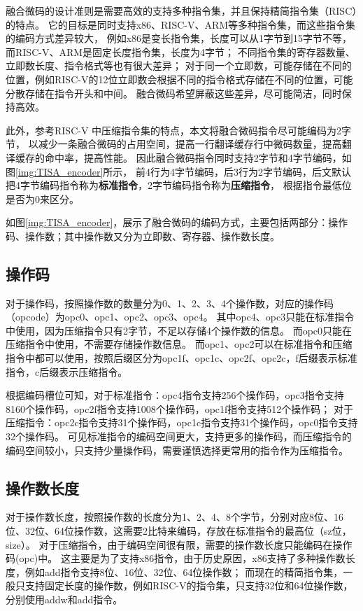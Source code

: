 融合微码的设计准则是需要高效的支持多种指令集，并且保持精简指令集（RISC）的特点。
它的目标是同时支持x86、RISC-V、ARM等多种指令集，而这些指令集的编码方式差异较大，
例如x86是变长指令集，长度可以从1字节到15字节不等，而RISC-V、ARM是固定长度指令集，长度为4字节；
不同指令集的寄存器数量、立即数长度、指令格式等也有很大差异；
对于同一个立即数，可能存储在不同的位置，例如RISC-V的12位立即数会根据不同的指令格式存储在不同的位置，可能分散存储在指令开头和中间。
融合微码希望屏蔽这些差异，尽可能简洁，同时保持高效。

此外，参考RISC-V 中压缩指令集的特点，本文将融合微码指令尽可能编码为2字节，
以减少一条融合微码的占用空间，提高一行翻译缓存行中微码数量，提高翻译缓存的命中率，提高性能。
因此融合微码指令同时支持2字节和4字节编码，如图\ref{img:TISA_encoder}所示，
前4行为4字节编码，后3行为2字节编码，后文默认把4字节编码指令称为\textbf{标准指令}，2字节编码指令称为\textbf{压缩指令}，
根据指令最低位是否为0来区分。

如图\ref{img:TISA_encoder}，展示了融合微码的编码方式，主要包括两部分：操作码、操作数；其中操作数又分为立即数、寄存器、操作数长度。



\subsection{操作码}
对于操作码，按照操作数的数量分为0、1、2、3、4个操作数，对应的操作码（opcode）为opc0、opc1、opc2、opc3、opc4。
其中opc4、opc3只能在标准指令中使用，因为压缩指令只有2字节，不足以存储4个操作数的信息。
而opc0只能在压缩指令中使用，不需要存储操作数信息。
而opc1、opc2可以在标准指令和压缩指令中都可以使用，按照后缀区分为opc1f、opc1c、opc2f、opc2c，f后缀表示标准指令，c后缀表示压缩指令。

根据编码槽位可知，对于标准指令：opc4指令支持256个操作码，opc3指令支持8160个操作码，opc2f指令支持1008个操作码，opc1f指令支持512个操作码；
对于压缩指令：opc2c指令支持31个操作码，opc1c指令支持31个操作码，opc0指令支持32个操作码。
可见标准指令的编码空间更大，支持更多的操作码，而压缩指令的编码空间较小，只支持少量操作码，需要谨慎选择更常用的指令作为压缩指令。

\subsection{操作数长度}
对于操作数长度，按照操作数的长度分为1、2、4、8个字节，分别对应8位、16位、32位、64位操作数，这需要2比特来编码，存放在标准指令的最高位（sz位，size）。
对于压缩指令，由于编码空间很有限，需要的操作数长度只能编码在操作码(opc)中。
这主要是为了支持x86指令，由于历史原因，x86支持了多种操作数长度，例如add指令支持8位、16位、32位、64位操作数；
而现在的精简指令集，一般只支持固定长度的操作数，例如RISC-V的指令集，只支持32位和64位操作数，分别使用addw和add指令。

